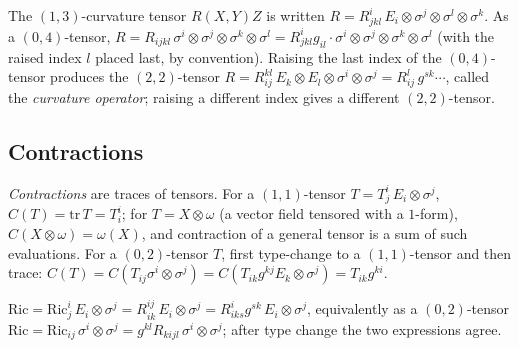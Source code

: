 \begin{notation}
  \label{def:pet-ch1-curvature-types}
  \leanok
  The $(1,3)$-curvature tensor $R(X,Y)Z$ is written
  $R=R^i_{jkl}\,E_i\otimes\sigma^j\otimes\sigma^l\otimes\sigma^k$. As a
  $(0,4)$-tensor, $R=R_{ijkl}\,\sigma^i\otimes\sigma^j\otimes\sigma^k\otimes\sigma^l
  =R^i_{jkl}g_{il}\cdot\sigma^i\otimes\sigma^j\otimes\sigma^k\otimes\sigma^l$ (with
  the raised index $l$ placed last, by convention). Raising the last index of the
  $(0,4)$-tensor produces the $(2,2)$-tensor
  $R=R^{kl}_{ij}\,E_k\otimes E_l\otimes\sigma^i\otimes\sigma^j
  =R^l_{ij}\,g^{sk}\cdots$, called the \emph{curvature operator}; raising a
  different index gives a different $(2,2)$-tensor.
\end{notation}

\subsection{Contractions}

\begin{definition}[contraction]
  \label{def:pet-ch1-contraction}
  \leanok
  \emph{Contractions} are traces of tensors. For a $(1,1)$-tensor
  $T=T^i_j\,E_i\otimes\sigma^j$, $C(T)=\mathrm{tr}\,T=T^i_i$; for $T=X\otimes\omega$
  (a vector field tensored with a $1$-form), $C(X\otimes\omega)=\omega(X)$, and
  contraction of a general tensor is a sum of such evaluations. For a $(0,2)$-tensor
  $T$, first type-change to a $(1,1)$-tensor and then trace:
  $C(T)=C(T_{ij}\sigma^i\otimes\sigma^j)=C(T_{ik}g^{kj}E_k\otimes\sigma^j)=T_{ik}g^{ki}$.
\end{definition}

\begin{remark}
  \label{rem:pet-ch1-ricci-contraction}
  \leanok
  $\mathrm{Ric}=\mathrm{Ric}^i_j\,E_i\otimes\sigma^j=R^{ij}_{ik}\,E_i\otimes\sigma^j
  =R^i_{iks}g^{sk}\,E_i\otimes\sigma^j$, equivalently as a $(0,2)$-tensor
  $\mathrm{Ric}=\mathrm{Ric}_{ij}\,\sigma^i\otimes\sigma^j=g^{kl}R_{kijl}\,\sigma^i\otimes\sigma^j$;
  after type change the two expressions agree.
\end{remark}

